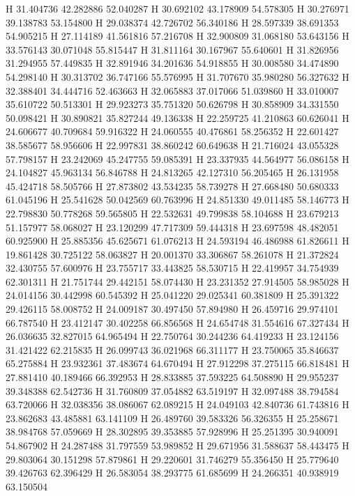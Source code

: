 \documentclass{article}
\begin{document}
H 31.404736 42.282886 52.040287
H 30.692102 43.178909 54.578305
H 30.276971 39.138783 53.154800
H 29.038374 42.726702 56.340186
H 28.597339 38.691353 54.905215
H 27.114189 41.561816 57.216708
H 32.900809 31.068180 53.643156
H 33.576143 30.071048 55.815447
H 31.811164 30.167967 55.640601
H 31.826956 31.294955 57.449835
H 32.891946 34.201636 54.918855
H 30.008580 34.474890 54.298140
H 30.313702 36.747166 55.576995
H 31.707670 35.980280 56.327632
H 32.388401 34.444716 52.463663
H 32.065883 37.017066 51.039860
H 33.010007 35.610722 50.513301
H 29.923273 35.751320 50.626798
H 30.858909 34.331550 50.098421
H 30.890821 35.827244 49.136338
H 22.259725 41.210863 60.626041
H 24.606677 40.709684 59.916322
H 24.060555 40.476861 58.256352
H 22.601427 38.585677 58.956606
H 22.997831 38.860242 60.649638
H 21.716024 43.055328 57.798157
H 23.242069 45.247755 59.085391
H 23.337935 44.564977 56.086158
H 24.104827 45.963134 56.846788
H 24.813265 42.127310 56.205465
H 26.131958 45.424718 58.505766
H 27.873802 43.534235 58.739278
H 27.668480 50.680333 61.045196
H 25.541628 50.042569 60.763996
H 24.851330 49.011485 58.146773
H 22.798830 50.778268 59.565805
H 22.532631 49.799838 58.104688
H 23.679213 51.157977 58.068027
H 23.120299 47.717309 59.444318
H 23.697598 48.482051 60.925900
H 25.885356 45.625671 61.076213
H 24.593194 46.486988 61.826611
H 19.861428 30.725122 58.063827
H 20.001370 33.306867 58.261078
H 21.372824 32.430755 57.600976
H 23.755717 33.443825 58.530715
H 22.419957 34.754939 62.301311
H 21.751744 29.442151 58.074430
H 23.231352 27.914505 58.985028
H 24.014156 30.442998 60.545392
H 25.041220 29.025341 60.381809
H 25.391322 29.426115 58.008752
H 24.009187 30.497450 57.894980
H 26.459716 29.974101 66.787540
H 23.412147 30.402258 66.856568
H 24.654748 31.554616 67.327434
H 26.036635 32.827015 64.965494
H 22.750764 30.244236 64.419233
H 23.124156 31.421422 62.215835
H 26.099743 36.021968 66.311177
H 23.750065 35.846637 65.275884
H 23.932361 37.483674 64.670494
H 27.912298 37.275115 66.818481
H 27.881410 40.189466 66.392953
H 28.833885 37.593225 64.508890
H 29.955237 39.348388 62.542736
H 31.760809 37.054882 63.519197
H 32.097488 38.794584 63.720066
H 32.038356 38.086067 62.089215
H 24.049103 42.840736 61.743816
H 23.862683 43.485881 63.141109
H 26.489760 39.583326 56.326355
H 25.258671 38.984768 57.059669
H 28.302895 39.353885 57.928996
H 25.251395 30.940091 54.867902
H 24.287488 31.797559 53.989852
H 29.671956 31.588637 58.443475
H 29.803064 30.151298 57.879861
H 29.220601 31.746279 55.356450
H 25.779640 39.426763 62.396429
H 26.583054 38.293775 61.685699
H 24.266351 40.938919 63.150504
\end{document}
